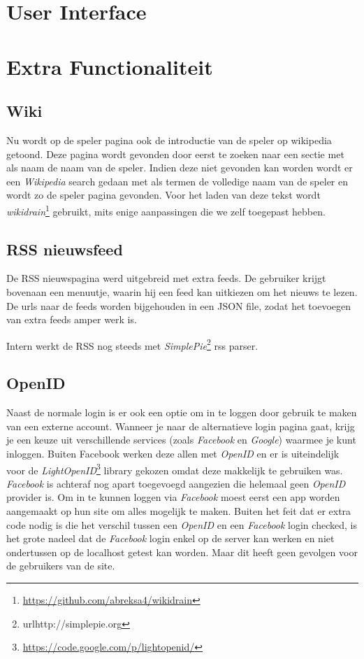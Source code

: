 \documentclass[11pt]{article}
\begin{document}
\section{User Interface}





\section{Extra Functionaliteit}


\subsection{Wiki}

Nu wordt op de speler pagina ook de introductie van de speler op wikipedia getoond.
Deze pagina wordt gevonden door eerst te zoeken naar een sectie met als naam de naam van de speler.
Indien deze niet gevonden kan worden wordt er een \emph{Wikipedia} search gedaan met als termen de volledige naam van de speler en wordt zo de speler pagina gevonden.
Voor het laden van deze tekst wordt \emph{wikidrain}\footnote{\url{https://github.com/abreksa4/wikidrain}} gebruikt, mits enige aanpassingen die we zelf toegepast hebben.


\subsection{RSS nieuwsfeed}

De RSS nieuwspagina werd uitgebreid met extra feeds. De gebruiker krijgt bovenaan een menuutje, waarin hij een feed kan uitkiezen om het nieuws te lezen.
De urls naar de feeds worden bijgehouden in een JSON file, zodat het toevoegen van extra feeds amper werk is.

Intern werkt de RSS nog steeds met \emph{SimplePie}\footnote{url{http://simplepie.org}} rss parser.



\subsection{OpenID}

Naast de normale login is er ook een optie om in te loggen door gebruik te maken van een externe account. Wanneer je naar de alternatieve login pagina gaat, krijg je een keuze uit verschillende services (zoals \emph{Facebook} en \emph{Google}) waarmee je kunt inloggen. Buiten Facebook werken deze allen met \emph{OpenID} en er is uiteindelijk voor de \emph{LightOpenID}\footnote{\url{https://code.google.com/p/lightopenid/}} library gekozen omdat deze makkelijk te gebruiken was. \emph{Facebook} is achteraf nog apart toegevoegd aangezien die helemaal geen \emph{OpenID} provider is. Om in te kunnen loggen via \emph{Facebook} moest eerst een app worden aangemaakt op hun site om alles mogelijk te maken. Buiten het feit dat er extra code nodig is die het verschil tussen een \emph{OpenID} en een \emph{Facebook} login checked, is het grote nadeel dat de \emph{Facebook} login enkel op de server kan werken en niet ondertussen op de localhost getest kan worden. Maar dit heeft geen gevolgen voor de gebruikers van de site.
\end{document}
